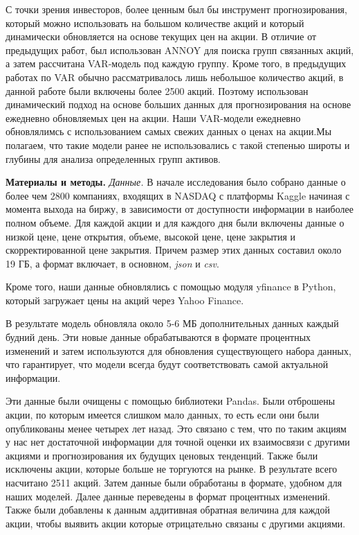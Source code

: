 \documentclass[
]{article}
\begin{document}
С точки зрения инвесторов, более ценным был бы инструмент
прогнозирования, который можно использовать на большом количестве акций
и который динамически обновляется на основе текущих цен на акции. В
отличие от предыдущих работ, был использован ANNOY для поиска групп
связанных акций, а затем рассчитана VAR-модель под каждую группу. Кроме
того, в предыдущих работах по VAR обычно рассматривалось лишь небольшое
количество акций, в данной работе были включены более 2500 акций.
Поэтому использован динамический подход на основе больших данных для
прогнозирования на основе ежедневно обновляемых цен на акции. Наши
VAR-модели ежедневно обновлялимсь с использованием самых свежих данных о
ценах на акции.Мы полагаем, что такие модели ранее не использовались с
такой степенью широты и глубины для анализа определенных групп активов.

\textbf{Материалы и методы.} \emph{Данные.} В начале исследования было
собрано данные о более чем 2800 компаниях, входящих в NASDAQ с платформы
Kaggle начиная с момента выхода на биржу, в зависимости от доступности
информации в наиболее полном объеме. Для каждой акции и для каждого дня
были включены данные о низкой цене, цене открытия, объеме, высокой цене,
цене закрытия и скорректированной цене закрытия. Причем размер этих
данных составил около 19 ГБ, а формат включает, в основном, \emph{json}
и \emph{csv}.

Кроме того, наши данные обновлялись с помощью модуля yfinance в Python,
который загружает цены на акций через Yahoo Finance.

В результате модель обновляла около 5-6 МБ дополнительных данных каждый
будний день. Эти новые данные обрабатываются в формате процентных
изменений и затем используются для обновления существующего набора
данных, что гарантирует, что модели всегда будут соответствовать самой
актуальной информации.

Эти данные были очищены с помощью библиотеки Pandas. Были отброшены
акции, по которым имеется слишком мало данных, то есть если они были
опубликованы менее четырех лет назад. Это связано с тем, что по таким
акциям у нас нет достаточной информации для точной оценки их взаимосвязи
с другими акциями и прогнозирования их будущих ценовых тенденций. Также
были исключены акции, которые больше не торгуются на рынке. В результате
всего насчитано 2511 акций. Затем данные были обработаны в формате,
удобном для наших моделей. Далее данные переведены в формат процентных
изменений. Также были добавлены к данным аддитивная обратная величина
для каждой акции, чтобы выявить акции которые отрицательно связаны с
другими акциями.
\end{document}
